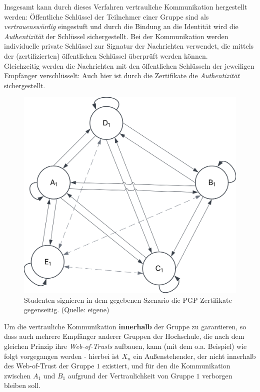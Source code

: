 \noindent
Insgesamt kann durch dieses Verfahren vertrauliche Kommunikation hergestellt werden: Öffentliche Schlüssel der Teilnehmer einer Gruppe sind als \textit{vertrauenswürdig} eingestuft und durch die Bindung an die Identität wird die \textit{Authentizität} der Schlüssel sichergestellt.
Bei der Kommunikation werden individuelle private Schlüssel zur Signatur der Nachrichten verwendet, die mittels der (zertifizierten) öffentlichen Schlüssel überprüft werden können.\\
Gleichzeitig werden die Nachrichten mit den öffentlichen Schlüsseln der jeweiligen Empfänger verschlüsselt: Auch hier ist durch die Zertifikate die \textit{Authentizität} sichergestellt.

\begin{figure}
    \centering
    \includegraphics[scale=0.4]{aufgabe 1/img/weboftrust.svg}
    \caption{Studenten signieren in dem gegebenen Szenario die PGP-Zertifikate gegenseitig. (Quelle: eigene)}
    \label{fig:weboftrust}
\end{figure}

\noindent
Um die vertrauliche Kommunikation \textbf{innerhalb} der Gruppe zu garantieren, so dass auch mehrere Empfänger anderer Gruppen der Hochschule, die nach dem gleichen Prinzip ihre \textit{Web-of-Trusts} aufbauen, kann (mit dem o.a. Beispiel) wie folgt vorgegangen werden - hierbei ist $X_n$ ein Außenstehender, der nicht innerhalb des Web-of-Trust der Gruppe $1$ existiert, und für den die Kommunikation zwischen $A_1$ und $B_1$ aufgrund der Vertraulichkeit von Gruppe $1$ verborgen bleiben soll.

